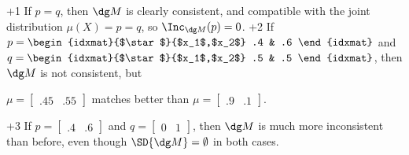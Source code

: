 \begin{frame}[t,label=semantics2]
{		\begin{itemize}
			+1 If $p = q$, then $\dg M$ is clearly consistent, and compatible with the joint distribution $\mu(X) = p = q$, so $\Inc_{\dg M}(p) = 0$. 
			+2 If $p = \begin{idxmat}{$\star$}{$x_1$,$x_2$} .4 & .6 \end{idxmat}$ and 
					$q = \begin{idxmat}{$\star$}{$x_1$,$x_2$} .5 & .5 \end{idxmat}$, 
					then $\dg M$ is not consistent, but 
					
					$\mu = \begin{bmatrix}%
						.45 & .55 \end{bmatrix}$ matches better than 
					$\mu = \begin{bmatrix} .9 & .1 \end{bmatrix}$.
					\medskip

			+3 If $p = \begin{bmatrix} .4 & .6 \end{bmatrix}$ and 
					$q = \begin{bmatrix} 0 & 1 \end{bmatrix}$, 
					then $\dg M$ is much more inconsistent than before, even though $\SD{\dg M} = \emptyset$ in both cases.
		\end{itemize}
	}
		

\end{frame}
